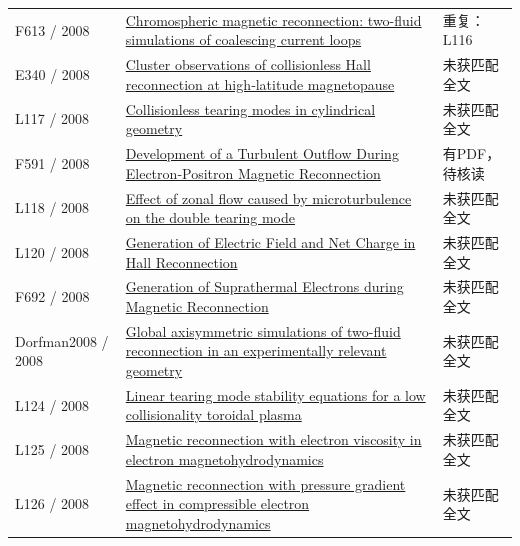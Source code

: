 \begin{longtable}{P{24mm}P{97mm}P{27mm}}
F613 / 2008 & \href{https://doi.org/10.1051/0004-6361:200809624}{Chromospheric magnetic reconnection: two-fluid simulations of coalescing current loops} & 重复：L116\\

E340 / 2008 & \href{https://doi.org/10.1029/2007ja012769}{Cluster observations of collisionless Hall reconnection at high‐latitude magnetopause} & 未获匹配全文\\

L117 / 2008 & \href{https://doi.org/10.1088/0741-3335/50/3/035005}{Collisionless tearing modes in cylindrical geometry} & 未获匹配全文\\

F591 / 2008 & \href{https://doi.org/10.1086/588088}{Development of a Turbulent Outflow During Electron‐Positron Magnetic Reconnection} & 有PDF，待核读\\

L118 / 2008 & \href{https://doi.org/10.1063/1.2969439}{Effect of zonal flow caused by microturbulence on the double tearing mode} & 未获匹配全文\\

L120 / 2008 & \href{https://doi.org/10.1088/0256-307x/25/8/055}{Generation of Electric Field and Net Charge in Hall Reconnection} & 未获匹配全文\\

F692 / 2008 & \href{http://citeseerx.ist.psu.edu/viewdoc/summary?doi=10.1.1.601.8469}{Generation of Suprathermal Electrons during Magnetic Reconnection} & 未获匹配全文\\

Dorfman2008 / 2008 & \href{https://doi.org/10.1063/1.2904600}{Global axisymmetric simulations of two-fluid reconnection in an experimentally relevant geometry} & 未获匹配全文\\

L124 / 2008 & \href{https://doi.org/10.1088/0741-3335/51/1/015009}{Linear tearing mode stability equations for a low collisionality toroidal plasma} & 未获匹配全文\\

L125 / 2008 & \href{https://doi.org/10.1063/1.2876622}{Magnetic reconnection with electron viscosity in electron magnetohydrodynamics} & 未获匹配全文\\

L126 / 2008 & \href{https://doi.org/10.1063/1.2895388}{Magnetic reconnection with pressure gradient effect in compressible electron magnetohydrodynamics} & 未获匹配全文\\


\end{longtable}
